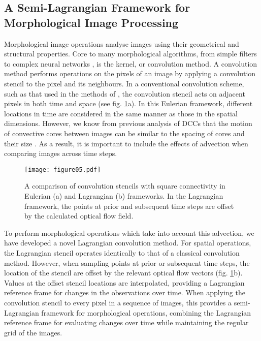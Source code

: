 \subsection{A Semi-Lagrangian Framework for Morphological Image Processing}

Morphological image operations analyse images using their geometrical and structural properties.
Core to many morphological algorithms, from simple filters to complex neural networks \citep{kalchbrenner_convolutional_2014}, is the kernel, or convolution method.
A convolution method performs operations on the pixels of an image by applying a convolution stencil to the pixel and its neighbours.
In a conventional convolution scheme, such as that used in the methods of \citet{fiolleau_algorithm_2013}, the convolution stencil acts on adjacent pixels in both time and space (see fig. \ref{fig:convolution_kernels}a).
In this Eulerian framework, different locations in time are considered in the same manner as those in the spatial dimensions.
However, we know from previous analysis of DCCs that the motion of convective cores between images can be similar to the spacing of cores and their size \citep{heikenfeld_tobac_2019}.
As a result, it is important to include the effects of advection when comparing images across time steps.


\begin{figure}[t]
    \texttt{[image: figure05.pdf]}
    \caption{A comparison of convolution stencils with square connectivity in Eulerian (a) and Lagrangian (b) frameworks. In the Lagrangian framework, the points at prior and subsequent time steps are offset by the calculated optical flow field.}
    \label{fig:convolution_kernels}
\end{figure}


To perform morphological operations which take into account this advection, we have developed a novel Lagrangian convolution method.
For spatial operations, the Lagrangian stencil operates identically to that of a classical convolution method.
However, when sampling points at prior or subsequent time steps, the location of the stencil are offset by the relevant optical flow vectors (fig. \ref{fig:convolution_kernels}b).
Values at the offset stencil locations are interpolated, providing a Lagrangian reference frame for changes in the observations over time.
When applying the convolution stencil to every pixel in a sequence of images, this provides a semi-Lagrangian framework for morphological operations, combining the Lagrangian reference frame for evaluating changes over time while maintaining the regular grid of the images.

